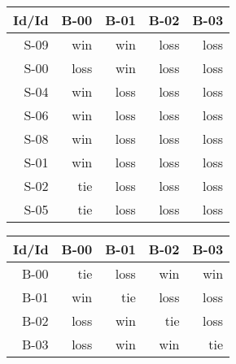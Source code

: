 \begin{tabular}{ | r | r | r | r | r | }
    \hline
        Id/Id  &   B-00  &   B-01  &   B-02  &   B-03  \\
    \hline
    \hline
         S-09  &    win  &    win  &   loss  &   loss  \\
    \hline
         S-00  &   loss  &    win  &   loss  &   loss  \\
    \hline
         S-04  &    win  &   loss  &   loss  &   loss  \\
    \hline
         S-06  &    win  &   loss  &   loss  &   loss  \\
    \hline
         S-08  &    win  &   loss  &   loss  &   loss  \\
    \hline
         S-01  &    win  &   loss  &   loss  &   loss  \\
    \hline
         S-02  &    tie  &   loss  &   loss  &   loss  \\
    \hline
         S-05  &    tie  &   loss  &   loss  &   loss  \\
    \hline
\end{tabular}


\begin{tabular}{ | r | r | r | r | r | }
    \hline
        Id/Id  &   B-00  &   B-01  &   B-02  &   B-03  \\
    \hline
    \hline
         B-00  &    tie  &   loss  &    win  &    win  \\
    \hline
         B-01  &    win  &    tie  &   loss  &   loss  \\
    \hline
         B-02  &   loss  &    win  &    tie  &   loss  \\
    \hline
         B-03  &   loss  &    win  &    win  &    tie  \\
    \hline
\end{tabular}




